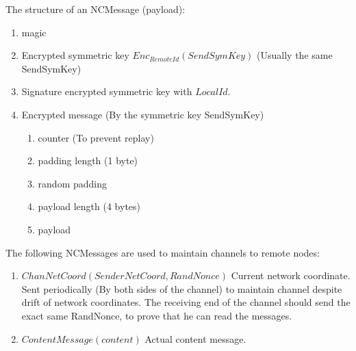 \documentclass{amsart}
\theoremstyle{definition}
\theoremstyle{remark}
\numberwithin{equation}{section}
\begin{document}
The structure of an NCMessage (payload):
\begin{enumerate}
  \item magic
  \item Encrypted symmetric key 
    $Enc_{RemoteId}(SendSymKey)$ (Usually the same SendSymKey)
  \item Signature encrypted symmetric key with $LocalId$.
  \item Encrypted message (By the symmetric key SendSymKey)
    \begin{enumerate}
      \item counter (To prevent replay)
      \item padding length (1 byte)
      \item random padding
      \item payload length (4 bytes)
      \item payload
    \end{enumerate}
\end{enumerate}

The following NCMessages are used to maintain channels to remote nodes:

\begin{enumerate}
  \item $ChanNetCoord(SenderNetCoord, RandNonce)$ Current network coordinate. Sent
    periodically (By both sides of the channel) to maintain channel despite
    drift of network coordinates. The receiving end of the channel should send
    the exact same RandNonce, to prove that he can read the messages.

  \item $ContentMessage(content)$
    Actual content message.

\end{enumerate}




\end{document}
